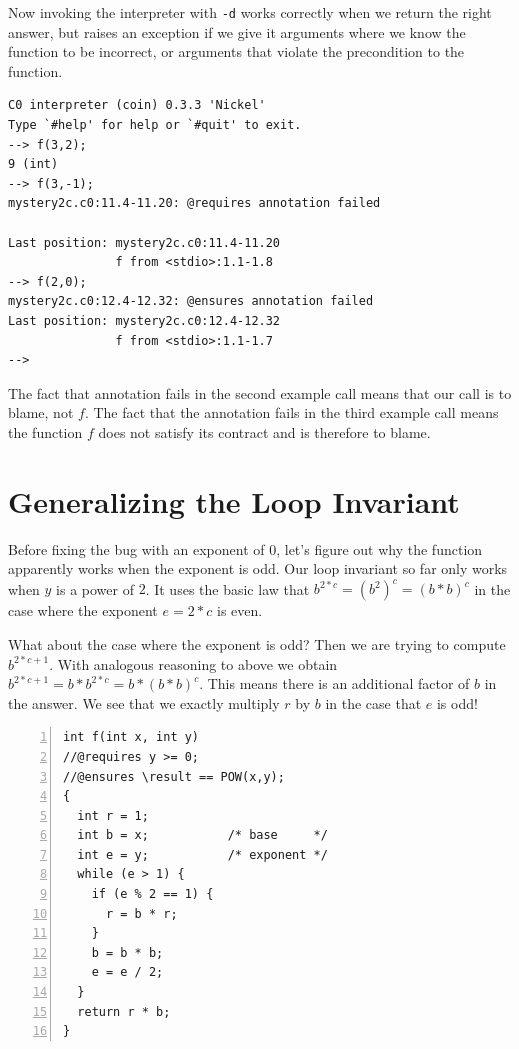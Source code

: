 Now invoking the interpreter with \lstinline'-d' works correctly when we
return the right answer, but raises an exception if we give it
arguments where we know the function to be incorrect, or
arguments that violate the precondition to the function.
\begin{lstlisting}[language={[coin]C}]
% coin mystery2c.c0 -d
C0 interpreter (coin) 0.3.3 'Nickel'
Type `#help' for help or `#quit' to exit.
--> f(3,2);
9 (int)
--> f(3,-1);
mystery2c.c0:11.4-11.20: @requires annotation failed

Last position: mystery2c.c0:11.4-11.20
               f from <stdio>:1.1-1.8
--> f(2,0);
mystery2c.c0:12.4-12.32: @ensures annotation failed
Last position: mystery2c.c0:12.4-12.32
               f from <stdio>:1.1-1.7
-->
\end{lstlisting}
The fact that \requires{} annotation fails in the second example call means
that our call is to blame, not $f$.  The fact that the \ensures{} annotation
fails in the third example call means the function $f$ does not satisfy its
contract and is therefore to blame.


\clearpage
\section{Generalizing the Loop Invariant}
\label{sec:contracts:loop_invariant_improvements}

Before fixing the bug with an exponent of $0$, let's figure out why
the function apparently works when the exponent is odd.  Our loop
invariant so far only works when $y$ is a power of $2$.  It uses the
basic law that $b^{2*c} = (b^2)^c = (b * b)^c$ in the case where the
exponent $e = 2*c$ is even.

What about the case where the exponent is odd?  Then we are trying to
compute $b^{2*c+1}$.  With analogous reasoning to above we obtain
$b^{2*c+1} = b * b^{2*c} = b * (b*b)^c$.  This means there is an
additional factor of $b$ in the answer.  We see that we exactly
multiply $r$ by $b$ in the case that $e$ is odd!

\begin{lstlisting}[language={[C0]C}, numbers=left]
int f(int x, int y)
//@requires y >= 0;
//@ensures \result == POW(x,y);
{
  int r = 1;
  int b = x;           /* base     */
  int e = y;           /* exponent */
  while (e > 1) {
    if (e % 2 == 1) {
      r = b * r;
    }
    b = b * b;
    e = e / 2;
  }
  return r * b;
}
\end{lstlisting}

